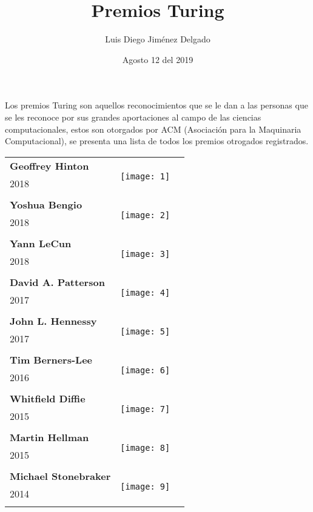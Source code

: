 \documentclass[12pt]{article}
\title{Premios Turing}
\author{Luis Diego Jiménez Delgado}
\date{Agosto 12 del 2019}
\begin{document}
\maketitle
Los premios Turing son aquellos reconocimientos que se le dan a las personas que se les reconoce por sus grandes aportaciones al campo de las ciencias computacionales, estos son otorgados por ACM (Asociación para la Maquinaria Computacional), se presenta una lista de todos los premios otrogados registrados.

\begin{center}
\begin{longtable}{| p{} | p{} | p{20cm}} 
\hline
\textbf{Geoffrey Hinton} &  \multirow{3}{4em}{\texttt{[image: 1]}} \\ 
2018&   \\ 
&\\
\hline
\textbf{Yoshua Bengio } &  \multirow{3}{4em}{\texttt{[image: 2]}} \\ 
2018&   \\ 
&\\
\hline
\textbf{Yann LeCun } &  \multirow{3}{4em}{\texttt{[image: 3]}} \\ 
2018&   \\ 
&\\
\hline
\textbf{David A. Patterson } &  \multirow{3}{4em}{\texttt{[image: 4]}} \\ 
2017&   \\ 
&\\
\hline
\textbf{John L. Hennessy } &  \multirow{3}{4em}{\texttt{[image: 5]}} \\ 
2017&   \\ 
&\\
\hline
\textbf{Tim Berners-Lee } &  \multirow{3}{4em}{\texttt{[image: 6]}} \\ 
2016&   \\ 
&\\
\hline
\textbf{Whitfield Diffie } &  \multirow{3}{4em}{\texttt{[image: 7]}} \\ 
2015&   \\ 
&\\
\hline
\textbf{Martin Hellman } &  \multirow{3}{4em}{\texttt{[image: 8]}} \\ 
2015&   \\ 
&\\
\hline
\textbf{Michael Stonebraker}  &  \multirow{3}{4em}{\texttt{[image: 9]}} \\ 
2014&   \\ 
&\\

\end{longtable}
\end{center}
\end{document}
